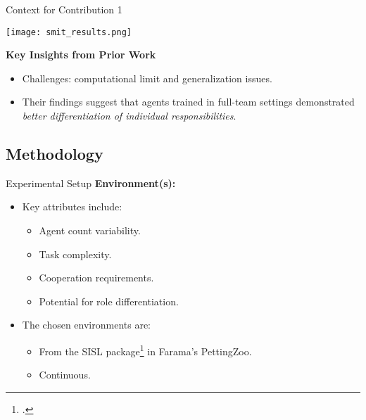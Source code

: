 \begin{frame}{Context for Contribution 1}
    \begin{table}
        \centering
        \texttt{[image: smit\_results.png]}
        \captionsetup{width=.75\linewidth}
        \caption{\footnotesize Win rate of row teams vs column teams;
            500 games of 11v11.~\footcite{smit2023}}
        \label{table:smit_winrates}
    \end{table}

    \textbf{Key Insights from Prior Work}
    \begin{itemize}
        \item Challenges: computational limit and generalization issues.
        \item Their findings suggest that agents trained in full-team settings demonstrated 
            \emph{better differentiation of individual responsibilities}.
    \end{itemize}
\end{frame}

\subsection{Methodology}


\begin{frame}{Experimental Setup}
    \textbf{Environment(s):}
    \begin{itemize}
        \item Key attributes include:
        \begin{itemize}
            \item Agent count variability.
            \item Task complexity.
            \item Cooperation requirements.
            \item Potential for role differentiation.
        \end{itemize}
        \item The chosen environments are:
        \begin{itemize}
            \item From the SISL package\footcite{gupta2017} in Farama's PettingZoo.
            \item Continuous.
        \end{itemize}
    \end{itemize}
\end{frame}


